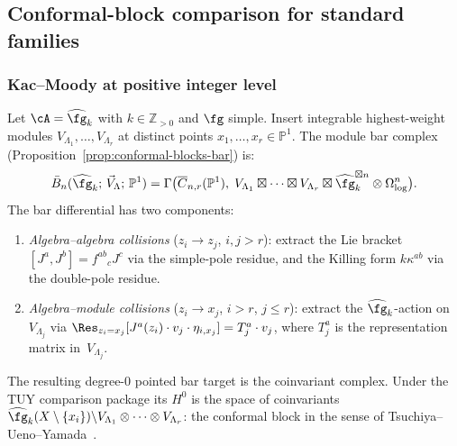 \subsection{Conformal-block comparison for standard families}
\label{sec:conformal-blocks-families}

\subsubsection{Kac--Moody at positive integer level}

Let $\cA = \widehat{\fg}_k$ with $k \in \mathbb{Z}_{>0}$ and
$\fg$ simple. Insert integrable highest-weight modules
$V_{\Lambda_1}, \ldots, V_{\Lambda_r}$ at distinct points
$x_1, \ldots, x_r \in \mathbb{P}^1$. The module bar complex
(Proposition~\ref{prop:conformal-blocks-bar}) is:
\[
\bar{B}_n(\widehat{\fg}_k;\, \vec{V}_\Lambda;\, \mathbb{P}^1)
= \Gamma\bigl(\overline{C}_{n,r}(\mathbb{P}^1),\;
V_{\Lambda_1} \boxtimes \cdots \boxtimes V_{\Lambda_r}
\boxtimes \widehat{\fg}_k^{\boxtimes n}
\otimes \Omega^n_{\log}\bigr).
\]
The bar differential has two components:
\begin{enumerate}
\item \emph{Algebra--algebra collisions} ($z_i \to z_j$,
 $i,j > r$): extract the Lie bracket $[J^a, J^b] = f^{ab}{}_c J^c$
 via the simple-pole residue, and the Killing form
 $k\kappa^{ab}$ via the double-pole residue.
\item \emph{Algebra--module collisions} ($z_i \to x_j$,
 $i > r$, $j \le r$): extract the $\widehat{\fg}_k$-action
 on~$V_{\Lambda_j}$ via $\Res_{z_i = x_j}[J^a(z_i) \cdot
 v_j \cdot \eta_{i,x_j}] = T^a_j \cdot v_j$, where
 $T^a_j$ is the representation matrix in~$V_{\Lambda_j}$.
\end{enumerate}
The resulting degree-$0$ pointed bar target is the coinvariant
complex. Under the TUY comparison package its \(H^0\) is the space of
coinvariants
$\widehat{\fg}_k(X \setminus \{x_i\}) \backslash
V_{\Lambda_1} \otimes \cdots \otimes V_{\Lambda_r}$: the conformal
block in the sense of Tsuchiya--Ueno--Yamada~\cite{TUY89}.

